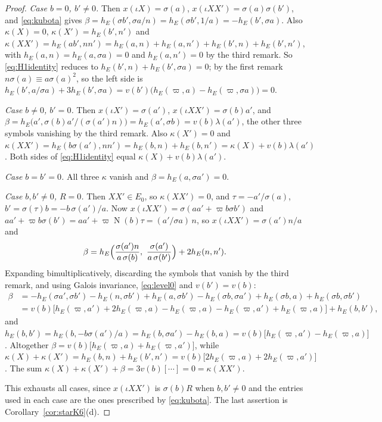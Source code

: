 \documentclass[11pt]{article}
\newcommand{\Nm}{\operatorname N}
\theoremstyle{plain}
\theoremstyle{definition}
\begin{document}
\begin{proof}
\emph{Case $b=0$, $b'\ne0$.}  Then $x(\iota X)=\sigma(a)$,
$x(\iota XX')=\sigma(a)\sigma(b')$, and \eqref{eq:kubota} gives
$\beta=h_E(\sigma b',\sigma a/n)=h_E(\sigma b',1/a)=-h_E(b',\sigma a)$.  Also
$\kappa(X)=0$, $\kappa(X')=h_E(b',n')$ and
$\kappa(XX')=h_E(ab',nn')=h_E(a,n)+h_E(a,n')+h_E(b',n)+h_E(b',n')$, with
$h_E(a,n)=h_E(a,\sigma a)=0$ and $h_E(a,n')=0$ by the third remark.  So
\eqref{eq:H1identity} reduces to $h_E(b',n)+h_E(b',\sigma a)=0$; by the
first remark $n\sigma(a)\equiv a\sigma(a)^2$, so the left side is
$h_E(b',a/\sigma a)+3h_E(b',\sigma a)=v(b')\bigl(h_E(\varpi,a)-h_E(\varpi,\sigma a)\bigr)=0$.

\emph{Case $b\ne0$, $b'=0$.}  Then $x(\iota X')=\sigma(a')$,
$x(\iota XX')=\sigma(b)a'$, and
$\beta=h_E\bigl(a',\sigma(b)a'/(\sigma(a')n)\bigr)=h_E(a',\sigma b)=v(b)\lambda(a')$,
the other three symbols vanishing by the third remark.  Also
$\kappa(X')=0$ and $\kappa(XX')=h_E(b\sigma(a'),nn')=h_E(b,n)+h_E(b,n')=\kappa(X)+v(b)\lambda(a')$.
Both sides of \eqref{eq:H1identity} equal $\kappa(X)+v(b)\lambda(a')$.

\emph{Case $b=b'=0$.}  All three $\kappa$ vanish and
$\beta=h_E(a,\sigma a')=0$.

\emph{Case $b,b'\ne0$, $R=0$.}  Then $XX'\in E_0$, so $\kappa(XX')=0$,
and $\tau=-a'/\sigma(a)$, $b'=\sigma(\tau)b=-b\,\sigma(a')/a$.  Now
$x(\iota XX')=\sigma(aa'+\varpi b\sigma b')$ and
$aa'+\varpi b\sigma(b')=aa'+\varpi\Nm(b)\tau=(a'/\sigma a)\,n$, so
$x(\iota XX')=\sigma(a')n/a$ and
\[
 \beta=h_E\Bigl(\frac{\sigma(a')n}{a\,\sigma(b)},\ \frac{\sigma(a')}{a\,\sigma(b')}\Bigr)+2h_E(n,n').
\]
Expanding bimultiplicatively, discarding the symbols that vanish by the
third remark, and using Galois invariance, \eqref{eq:level0} and
$v(b')=v(b)$:
\begin{align*}
 \beta&=-h_E(\sigma a',\sigma b')-h_E(n,\sigma b')+h_E(a,\sigma b')-h_E(\sigma b,\sigma a')+h_E(\sigma b,a)+h_E(\sigma b,\sigma b')\\
 &=v(b)\bigl[h_E(\varpi,a')+2h_E(\varpi,a)-h_E(\varpi,a)-h_E(\varpi,a')+h_E(\varpi,a)\bigr]+h_E(b,b'),
\end{align*}
and $h_E(b,b')=h_E(b,-b\sigma(a')/a)=h_E(b,\sigma a')-h_E(b,a)=v(b)\bigl[h_E(\varpi,a')-h_E(\varpi,a)\bigr]$.
Altogether $\beta=v(b)\bigl[h_E(\varpi,a)+h_E(\varpi,a')\bigr]$, while
$\kappa(X)+\kappa(X')=h_E(b,n)+h_E(b',n')=v(b)\bigl[2h_E(\varpi,a)+2h_E(\varpi,a')\bigr]$.
The sum $\kappa(X)+\kappa(X')+\beta=3v(b)[\cdots]=0=\kappa(XX')$.

This exhausts all cases, since $x(\iota XX')$ is $\sigma(b)R$ when
$b,b'\ne0$ and the entries used in each case are the ones prescribed by
\eqref{eq:kubota}.  The last assertion is Corollary~\ref{cor:starK6}(d).
\end{proof}
\end{document}

